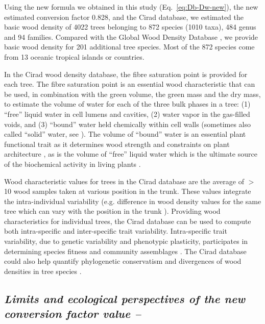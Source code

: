 \documentclass[a4paper, 12pt, leqno, dvipsnames]{article}\usepackage[]{graphicx}\usepackage[]{color}
\begin{document}
Using the new formula we obtained in this study (Eq.~\ref{eq:Db-Dw-new}), the new estimated conversion factor 0.828, and the Cirad database, we estimated the basic wood density of 4022 trees belonging to 872 species (1010 taxa), 484 genus and 94 families. Compared with the Global Wood Density Database \citep{Zanne2009}, we provide basic wood density for 201 additional tree species. Most of the 872 species come from 13 oceanic tropical islands or countries.

In the Cirad wood density database, the fibre saturation point is provided for each tree. The fibre saturation point is an essential wood characteristic that can be used, in combination with the green volume, the green mass and the dry mass, to estimate the volume of water for each of the three bulk phases in a tree: (1) ``free'' liquid water in cell lumens and cavities, (2) water vapor in the gas-filled voids, and (3) ``bound'' water held chemically within cell walls (sometimes also called ``solid'' water, see \citet{Berry2005}). The volume of ``bound'' water is an essential plant functional trait as it determines wood strength and constraints on plant architecture \citep{Niklas1993}, as is the volume of ``free'' liquid water which is the ultimate source of the biochemical activity in living plants \citep{Berry2005}.

Wood characteristic values for trees in the Cirad database are the average of $>$10 wood samples taken at various position in the trunk. These values integrate the intra-individual variability (e.g. difference in wood density values for the same tree which can vary with the position in the trunk \citep{Bastin2015}). Providing wood characteristics for individual trees, the Cirad database can be used to compute both intra-specific and inter-specific trait variability. Intra-specific trait variability, due to genetic variability and phenotypic plasticity, participates in determining species fitness and community assemblages \citep{Courbaud2012, Albert2011, Roughgarden1979}. The Cirad database could also help quantify phylogenetic conservatism and divergences of wood densities in tree species \citep{Flores2011}.

\subsection*{\textit{Limits and ecological perspectives of the new conversion factor value --}}
\end{document}
